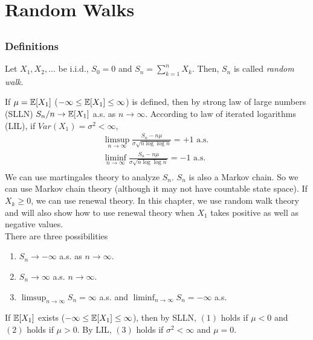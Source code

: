 \documentclass[all-lectures.tex]{subfiles}
\begin{document}

\setcounter{section}{2}
\setcounter{subsection}{1}
\chapter{Random Walks}
\section*{}
\subsection{Definitions}
\begin{defn}
Let $X_1,X_2,\dots$ be i.i.d., $S_0 = 0$ and $S_n = \sum_{k=1}^n X_k$. Then, $S_n$ is called \textit{random walk}. 
\end{defn}

If $\mu = \mathbb{E}[X_1]$ ($-\infty \leq \mathbb{E}[X_1] \leq \infty$) is defined, then by strong law of large numbers (SLLN) $S_n/n \to \mathbb{E}[X_1]$ a.s. as $n \to \infty$. According to law of iterated logarithms (LIL), if $Var(X_1) = \sigma^2 < \infty$,
\begin{align*}
\limsup_{n \to \infty} \frac{S_n-n\mu}{\sigma \sqrt{n\log \log n}} = +1 \text{ a.s. } \\
\liminf_{n \to \infty} \frac{S_n-n\mu}{\sigma \sqrt{n\log \log n}} = -1 \text{ a.s. } \\
\end{align*}
We can use martingales theory to analyze $S_n$. $S_n$ is also a Markov chain. So we can use Markov chain theory (although it may not have countable state space). If $X_k \geq 0$, we can use renewal theory. In this chapter, we use random walk theory and will also show how to use renewal theory when $X_1$ takes positive as well as negative values.\\
\indent There are three possibilities
\begin{enumerate}[label=(\arabic*)]
\item  $S_n \to -\infty$ a.s. as $n \to \infty$.
\item  $S_n \to \infty$ a.s. $n \to \infty$. 
\item  $\limsup_{n\to \infty} S_n = \infty$ a.s. and $\liminf_{n\to \infty} S_n = -\infty$ a.s.
\end{enumerate}
If $\mathbb{E}[X_1]$ exists ($-\infty \leq \mathbb{E}[X_1] \leq \infty$), then by SLLN, $(1)$ holds if $\mu <0$ and $(2)$ holds if $\mu>0$. By LIL, $(3)$ holds if $\sigma^2 < \infty$ and $\mu = 0$.
\end{document}
